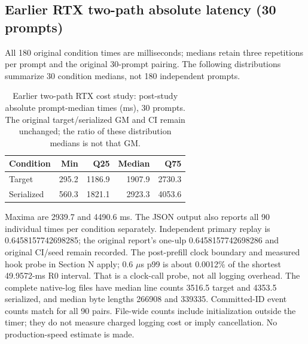 \subsection{Earlier RTX two-path absolute latency (30 prompts)}
All 180 original condition times are milliseconds; medians retain three repetitions per prompt and the original 30-prompt pairing. The following distributions summarize 30 condition medians, not 180 independent prompts.
\begin{table}[t]
\caption{Earlier two-path RTX cost study: post-study absolute prompt-median times (ms), 30 prompts. The original target/serialized GM and CI remain unchanged; the ratio of these distribution medians is not that GM.}
\label{tab:rtxabsolutetime}
\centering
\begin{tabular}{lrrrr}
\toprule
Condition & Min & Q25 & Median & Q75 \\
\midrule
Target & 295.2 & 1186.9 & 1907.9 & 2730.3 \\
Serialized & 560.3 & 1821.1 & 2923.3 & 4053.6 \\
\bottomrule
\end{tabular}
\end{table}
Maxima are 2939.7 and 4490.6 ms. The JSON output also reports all 90 individual times per condition separately. Independent primary replay is 0.6458157742698285; the original report's one-ulp 0.6458157742698286 and original CI/seed remain recorded. The post-prefill clock boundary and measured hook probe in Section N apply; 0.6 $\mu$s p99 is about 0.0012\% of the shortest 49.9572-ms R0 interval. That is a clock-call probe, not all logging overhead. The complete native-log files have median line counts 3516.5 target and 4353.5 serialized, and median byte lengths 266908 and 339335. Committed-ID event counts match for all 90 pairs. File-wide counts include initialization outside the timer; they do not measure charged logging cost or imply cancellation. No production-speed estimate is made.

